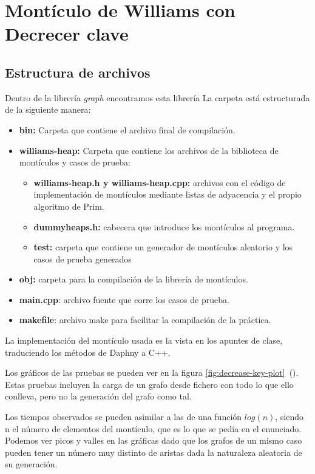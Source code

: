 \section{Montículo de Williams con Decrecer clave}
 {\small
  \subsection{Estructura de archivos}
  Dentro de la librería \textit{graph} encontramos esta librería
  La carpeta está estructurada de la siguiente manera:
  \begin{itemize}
      \item\textbf{bin:} Carpeta que contiene el archivo final de compilación.
      \item\textbf{williams-heap:} Carpeta que contiene los archivos de la biblioteca de montículos y casos de prueba:
      \begin{itemize}
          \item\textbf{williams-heap.h y williams-heap.cpp:} archivos con el código de implementación de montículos mediante listas de adyacencia y el propio algoritmo de Prim.
          \item\textbf{dummyheaps.h:} cabecera que introduce los montículos al programa.
          \item\textbf{test:} carpeta que contiene un generador de montículos aleatorio y los casos de prueba generados
      \end{itemize}
      \item\textbf{obj:} carpeta para la compilación de la librería de montículos.
      \item\textbf{main.cpp}: archivo fuente que corre los casos de prueba.
      \item\textbf{makefile}: archivo make para facilitar la compilación de la práctica.
  \end{itemize}

  La implementación del montículo usada es la vista en los apuntes de clase, traduciendo los métodos de Daphny a C++.


  Los gráficos de las pruebas se pueden ver en la figura \ref{fig:decrease-key-plot}~(). Estas pruebas incluyen la carga de un grafo desde fichero con todo lo que ello conlleva, pero no la generación del grafo como tal.

  Los tiempos observados se pueden asimilar a las de una función $log(n)$, siendo n el número de elementos del montículo, que es lo que se pedía en el enunciado. Podemos ver picos y valles en las gráficas dado que los grafos de un mismo caso pueden tener un número muy distinto de aristas dada la naturaleza aleatoria de su generación.
 }
